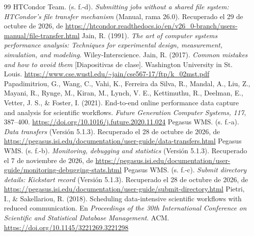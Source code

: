 \begin{thebibliography}{99}
 HTCondor Team. (s. f.-d). \emph{Submitting jobs without a shared file system: HTCondor's file transfer mechanism} (Manual, rama 26.0). Recuperado el 29 de octubre de 2026, de \url{https://htcondor.readthedocs.io/en/v26_0-branch/users-manual/file-transfer.html}
 Jain, R. (1991). \emph{The art of computer systems performance analysis: Techniques for experimental design, measurement, simulation, and modeling}. Wiley-Interscience.
 Jain, R. (2017). \emph{Common mistakes and how to avoid them} [Diapositivas de clase]. Washington University in St. Louis. \url{https://www.cse.wustl.edu/~jain/cse567-17/ftp/k_02mst.pdf}
 Papadimitriou, G., Wang, C., Vahi, K., Ferreira da Silva, R., Mandal, A., Liu, Z., Mayani, R., Rynge, M., Kiran, M., Lynch, V. E., Kettimuthu, R., Deelman, E., Vetter, J. S., \& Foster, I. (2021). End-to-end online performance data capture and analysis for scientific workflows. \emph{Future Generation Computer Systems, 117}, 387--400. \url{https://doi.org/10.1016/j.future.2020.11.024}
 Pegasus WMS. (s. f.-a). \emph{Data transfers} (Versión 5.1.3). Recuperado el 28 de octubre de 2026, de \url{https://pegasus.isi.edu/documentation/user-guide/data-transfers.html}
 Pegasus WMS. (s. f.-b). \emph{Monitoring, debugging and statistics} (Versión 5.1.3). Recuperado el 7 de noviembre de 2026, de \url{https://pegasus.isi.edu/documentation/user-guide/monitoring-debugging-stats.html}
 Pegasus WMS. (s. f.-c). \emph{Submit directory details: Kickstart record} (Versión 5.1.3). Recuperado el 28 de octubre de 2026, de \url{https://pegasus.isi.edu/documentation/user-guide/submit-directory.html}
 Pietri, I., \& Sakellariou, R. (2018). Scheduling data-intensive scientific workflows with reduced communication. En \emph{Proceedings of the 30th International Conference on Scientific and Statistical Database Management}. ACM. \url{https://doi.org/10.1145/3221269.3221298}
\end{thebibliography}
